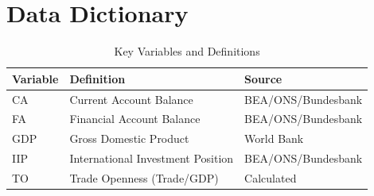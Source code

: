 \documentclass[11pt,a4paper]{article}
\begin{document}
\section{Data Dictionary}
\begin{table}[h]
\centering
\caption{Key Variables and Definitions}
\begin{tabular}{lll}
\toprule
\textbf{Variable} & \textbf{Definition} & \textbf{Source} \\
\midrule
CA & Current Account Balance & BEA/ONS/Bundesbank \\
FA & Financial Account Balance & BEA/ONS/Bundesbank \\
GDP & Gross Domestic Product & World Bank \\
IIP & International Investment Position & BEA/ONS/Bundesbank \\
TO & Trade Openness (Trade/GDP) & Calculated \\
\bottomrule
\end{tabular}
\end{table}
\end{document}
